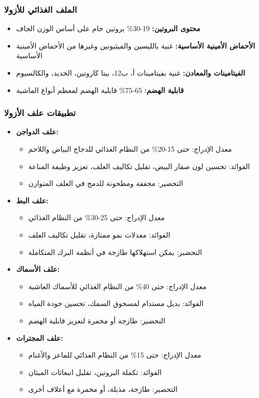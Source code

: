 \subsubsection{الملف الغذائي للأزولا}
\begin{itemize}
    \item \textbf{محتوى البروتين:} 19-30\% بروتين خام على أساس الوزن الجاف
    \item \textbf{الأحماض الأمينية الأساسية:} غنية بالليسين والميثيونين وغيرها من الأحماض الأمينية الأساسية
    \item \textbf{الفيتامينات والمعادن:} غنية بفيتامينات أ، ب12، بيتا كاروتين، الحديد، والكالسيوم
    \item \textbf{قابلية الهضم:} 65-75\% قابلية الهضم لمعظم أنواع الماشية
\end{itemize}

\subsubsection{تطبيقات علف الأزولا}
\begin{itemize}
    \item \textbf{علف الدواجن:}
    \begin{itemize}
        \item معدل الإدراج: حتى 15-20\% من النظام الغذائي للدجاج البياض واللاحم
        \item الفوائد: تحسين لون صفار البيض، تقليل تكاليف العلف، تعزيز وظيفة المناعة
        \item التحضير: مجففة ومطحونة للدمج في العلف المتوازن
    \end{itemize}
    
    \item \textbf{علف البط:}
    \begin{itemize}
        \item معدل الإدراج: حتى 25-30\% من النظام الغذائي
        \item الفوائد: معدلات نمو ممتازة، تقليل تكاليف العلف
        \item التحضير: يمكن استهلاكها طازجة في أنظمة البرك المتكاملة
    \end{itemize}
    
    \item \textbf{علف الأسماك:}
    \begin{itemize}
        \item معدل الإدراج: حتى 40\% من النظام الغذائي للأسماك العاشبة
        \item الفوائد: بديل مستدام لمسحوق السمك، تحسين جودة المياه
        \item التحضير: طازجة أو مخمرة لتعزيز قابلية الهضم
    \end{itemize}
    
    \item \textbf{علف المجترات:}
    \begin{itemize}
        \item معدل الإدراج: حتى 15\% من النظام الغذائي للماعز والأغنام
        \item الفوائد: تكملة البروتين، تقليل انبعاثات الميثان
        \item التحضير: طازجة، مذبلة، أو مخمرة مع أعلاف أخرى
    \end{itemize}
\end{itemize}

